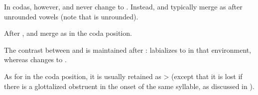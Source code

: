 \begin{exe}
    \ex \mouth
    \ex \arrowkaxe
    \ex \chaja
    \ex \price
    \ex \jelayuk
    \ex \vrbpl
    \ex \grass
    \ex \gov
    \ex \palosanto
    \ex \nightnw
    \ex \sandyplace
    \ex \firewoodhuk
    \ex \temperance
    \ex \pushv
    \ex \caracara
    \ex \mistolf
    \ex \mistolt
\end{exe}

In codas, however,  and  never change to . Instead,  and  typically merge as  after unrounded vowels (note that  is unrounded).

\begin{exe}
    \ex \fatv
    \ex \bite
    \ex \cutdown
    \ex \suncho
    \ex \takeaway
    \ex \hole
    \ex \dividev
    \ex \youngerbro
    \ex \barnowl
    \ex \oldn
    \ex \wash
    \ex \bow
    \ex \smelln
    \ex \pathn
    \ex \jabiru
    \ex \longv
    \ex \anteater
    \ex \pseudo
    \ex \abdcavity
    \ex \shoot
    \ex \carrysh
    \ex \dig
    \ex \smoke
    \ex \fullriver
    \ex \tsofatajf
    \ex \paloflojof
    \ex \burrow
    \ex \blackalgarrobof
    \ex \stagnant
    \ex \rhea
    \ex \night
    \ex \tuscaf
    \ex \caracara
    \ex \peccary
    \ex \mistolf
    \ex \argentineboa
    \ex \chaguara
    \ex \wildbean
    \ex \skin
    \ex \firei
    \ex \puma
\end{exe}

After ,  and  merge as  in the coda position.

\begin{exe}
    \ex \centipede
    \ex \finger
    \ex \sweat
    \ex \eatvt
    \ex \largefat
\end{exe}

The contrast between  and  is maintained after :  labializes to  in that environment, whereas  changes to .

\begin{exe}
    \ex \najendup
    \ex \deep
    \ex \far
    \ex \aunt
\end{exe}

As for  in the coda position, it is usually retained as  >  (except that it is lost if there is a glottalized obstruent in the onset of the same syllable, as discussed in ).

